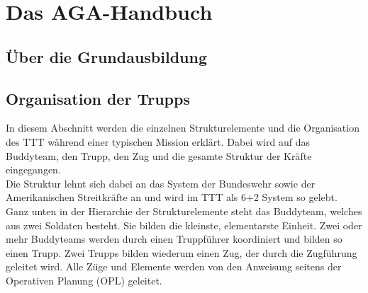\section{Das AGA-Handbuch}
\subsection{Über die Grundausbildung}
\subsection{Organisation der Trupps}
In diesem Abschnitt werden die einzelnen Strukturelemente und die Organisation des TTT während einer typischen Mission erklärt. Dabei wird auf das Buddyteam, den Trupp, den Zug und die gesamte Struktur der Kräfte eingegangen.\\
Die Struktur lehnt sich dabei an das System der Bundeswehr sowie der Amerikanischen Streitkräfte an und wird im TTT als 6+2 System so gelebt.\\
Ganz unten in der Hierarchie der Strukturelemente steht das Buddyteam, welches aus zwei Soldaten besteht. Sie bilden die kleinste, elementarste Einheit. Zwei oder mehr Buddyteams werden durch einen Truppführer koordiniert und bilden so einen Trupp. Zwei Trupps bilden wiederum einen Zug, der durch die Zugführung geleitet wird. Alle Züge und Elemente werden von den Anweisung seitens der Operativen Planung (OPL) geleitet.  
